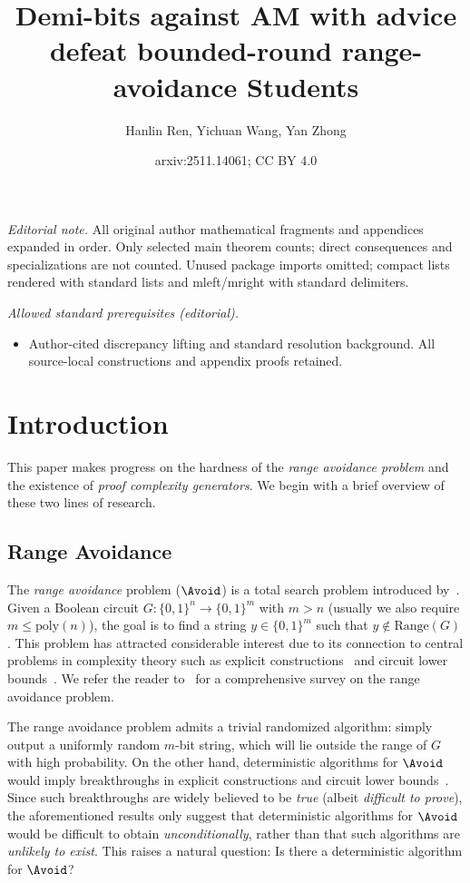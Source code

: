 \documentclass[10pt,a4paper]{article}
\title{Demi-bits against AM with advice defeat bounded-round range-avoidance Students}
\author{Hanlin Ren, Yichuan Wang, Yan Zhong}
\date{arxiv:2511.14061; CC BY 4.0}
\theoremstyle{definition}
\theoremstyle{remark}
\renewcommand{\poly}{\mathrm{poly}}
\newcommand{\Range}{\mathrm{Range}}
\begin{document}
\maketitle
\noindent\textit{Editorial note.} All original author mathematical fragments and appendices expanded in order. Only selected main theorem counts; direct consequences and specializations are not counted. Unused package imports omitted; compact lists rendered with standard lists and mleft/mright with standard delimiters.\par\medskip
\noindent\textit{Allowed standard prerequisites (editorial).}\begin{itemize}
\item Author-cited discrepancy lifting and standard resolution background. All source-local constructions and appendix proofs retained.
\end{itemize}\medskip
\section{Introduction}







This paper makes progress on the hardness of the \emph{range avoidance problem} and the existence of \emph{proof complexity generators}. We begin with a brief overview of these two lines of research.




\subsection{Range Avoidance}
The \emph{range avoidance} problem ($\Avoid$) is a total search problem introduced by~\cite{KKMP21,Korten21,RenSW22}. Given a Boolean circuit $G: \{0,1\}^n \rightarrow \{0,1\}^m$ with $m > n$ (usually we also require $m\leq\poly(n)$), the goal is to find a string $y \in \{0,1\}^m$ such that $y \not\in \Range(G)$. This problem has attracted considerable interest due to its connection to central problems in complexity theory such as explicit constructions~\cite{Korten21, RenSW22, ChenHLR23, GuruswamiLW22, GajulapalliGNS23} and circuit lower bounds~\cite{Korten21, CHR24, Li24, KortenP24}. We refer the reader to~\cite{Korten-EATCS} for a comprehensive survey on the range avoidance problem. %

The range avoidance problem admits a trivial randomized algorithm: simply output a uniformly random $m$-bit string, which will lie outside the range of $G$ with high probability. On the other hand, deterministic algorithms for $\Avoid$ would imply breakthroughs in explicit constructions and circuit lower bounds~\cite{Korten21, RenSW22, GuruswamiLW22, GajulapalliGNS23}. Since such breakthroughs are widely believed to be \emph{true} (albeit \emph{difficult to prove}), the aforementioned results only suggest that deterministic algorithms for $\Avoid$ would be difficult to obtain \emph{unconditionally}, rather than that such algorithms are \emph{unlikely to exist}. This raises a natural question: Is there a deterministic algorithm for $\Avoid$?
\end{document}
